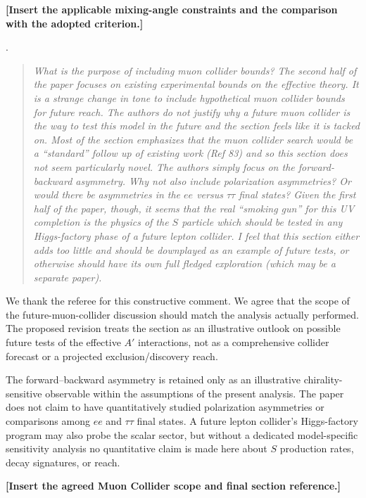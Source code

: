 \documentclass[12pt,a4paper]{article}
\begin{document}
\textbf{[Insert the applicable mixing-angle constraints and the comparison with the adopted criterion.]}

\medskip
{}.
\begin{quote}\itshape
What is the purpose of including muon collider bounds? The second half of the paper focuses on existing experimental bounds on the effective theory. It is a strange change in tone to include hypothetical muon collider bounds for future reach. The authors do not justify why a future muon collider is the way to test this model in the future and the section feels like it is tacked on. Most of the section emphasizes that the muon collider search would be a ``standard'' follow up of existing work (Ref 83) and so this section does not seem particularly novel. The authors simply focus on the forward-backward asymmetry. Why not also include polarization asymmetries? Or would there be asymmetries in the \(ee\) versus \(\tau\tau\) final states? Given the first half of the paper, though, it seems that the real ``smoking gun'' for this UV completion is the physics of the \(S\) particle which should be tested in any Higgs-factory phase of a future lepton collider. I feel that this section either adds too little and should be downplayed as an example of future tests, or otherwise should have its own full fledged exploration (which may be a separate paper).
\end{quote}


We thank the referee for this constructive comment. We agree that the scope of the future-muon-collider discussion should match the analysis actually performed. The proposed revision treats the section as an illustrative outlook on possible future tests of the effective \(A'\) interactions, not as a comprehensive collider forecast or a projected exclusion/discovery reach.

The forward--backward asymmetry is retained only as an illustrative chirality-sensitive observable within the assumptions of the present analysis. The paper does not claim to have quantitatively studied polarization asymmetries or comparisons among \(ee\) and \(\tau\tau\) final states. A future lepton collider's Higgs-factory program may also probe the scalar sector, but without a dedicated model-specific sensitivity analysis no quantitative claim is made here about \(S\) production rates, decay signatures, or reach.

\textbf{[Insert the agreed Muon Collider scope and final section reference.]}
\end{document}
